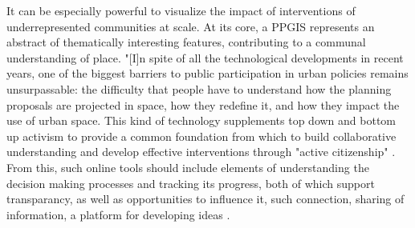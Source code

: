It can be especially powerful to visualize the impact of interventions of underrepresented communities at scale\cite{McQueenBaker2015}. %
At its core, a PPGIS represents an abstract of thematically interesting features, contributing to a communal understanding of place\cite{Brown2012}. %
"[I]n spite of all the technological developments in recent years, one of the biggest barriers to public participation in urban policies remains unsurpassable: the difficulty that people have to understand how the planning proposals are projected in space, how they redefine it, and how they impact the use of urban space\cite{Painho2013}. %
This kind of technology supplements top down and bottom up activism to provide a common foundation from which to build collaborative understanding and develop effective interventions through "active citizenship" \cite{Kleinhans2015}.%
From this, such online tools should include elements of understanding the decision making processes and tracking its progress, both of which support transparancy, as well as opportunities to influence it, such connection, sharing of information, a platform for developing ideas \cite{Afzalan2017}. %

